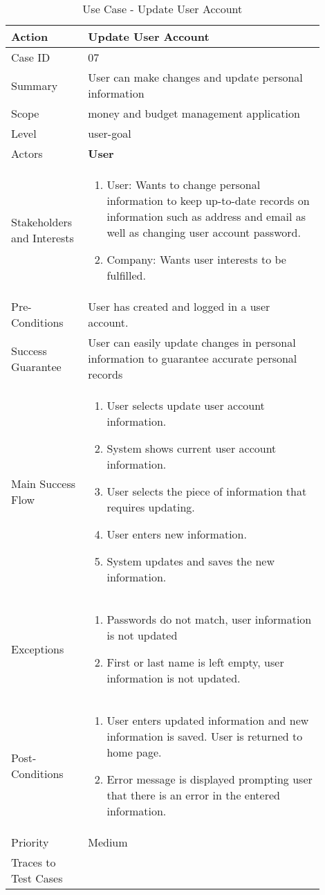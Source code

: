 \documentclass[11pt]{article}
\newcounter{use case ID}
\newcommand\tabularhead[1]{
    \begin{table}[ht]
        \addtocounter{use case ID}{1}
        \caption{Use Case \arabic{use case ID} - #1}
        \vspace{0.2cm}
        \begin{tabular}{|p{0.2\linewidth}|p{0.70\linewidth}|}
            \hline
            \textbf{Action} & \textbf{#1} \\
            \hline}
\newcommand\addrow[2]{#1 & #2\\ \hline}
\newcommand\addmulrow[2]{ \begin{minipage}[t][][t]{2.5cm}#1\end{minipage}
                &\begin{minipage}[t][][t]{11cm}
                    \begin{enumerate}[itemsep=-1ex] #2   \end{enumerate}
                \end{minipage}\vfill\\ \hline}
\newenvironment{usecase}{\tabularhead}
        {\hline\end{tabular}\end{table}}
\newcounter{req ID}
\begin{document}
\begin{usecase}{Update User Account}
    \addrow{Case ID}{07}
    \addrow{Summary}{User can make changes and update personal information}
    \addrow{Scope}{money and budget management application}
    \addrow{Level}{user-goal}
    \addrow{Actors}{\textbf{User}}
    \addmulrow{Stakeholders and Interests}{
    \item User:  Wants to change personal information to keep up-to-date records on information such as address and email as well as changing user account password.
    \item Company: Wants user interests to be fulfilled. }
    \addrow{Pre-Conditions}{User has created and logged in a user account.}
    \addrow{Success Guarantee}{User can easily update changes in personal information to guarantee accurate personal records }
    \addmulrow{Main Success Flow}{
    \item User selects update user account information.
    \item System shows current user account information.
    \item User selects the piece of information that requires updating.
    \item User enters new information.
    \item System updates and saves the new information.
    }
    \addmulrow{Exceptions}{
    \item Passwords do not match, user information is not updated
    \item First or last name is left empty, user information is not updated.
    }
    \addmulrow{Post-Conditions}{
    \item User enters updated information and new information is saved. User is returned to home page.
    \item Error message is displayed prompting user that there is an error in the entered information.
    }
    \addrow{Priority}{Medium}
    \addrow{Traces to Test Cases}{}
\end{usecase}
\end{document}

